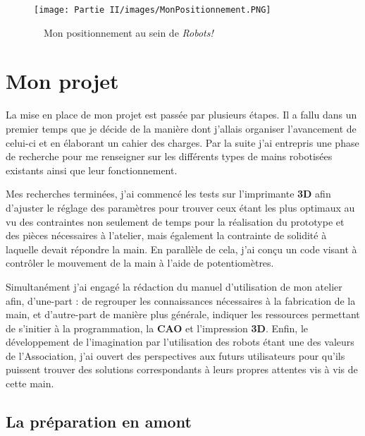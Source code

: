 \begin{figure}[!h]
    \centering
    \texttt{[image: Partie II/images/MonPositionnement.PNG]}
    \caption{\, \, Mon positionnement au sein de \textit{Robots!}}
    \label{fig_3.2.0.1}
\end{figure}


\section{Mon projet}

La mise en place de mon projet est passée par plusieurs étapes. Il a fallu dans un premier temps que je décide de la manière dont j'allais organiser l'avancement de celui-ci et en élaborant un cahier des charges. Par la suite j'ai entrepris une phase de recherche pour me renseigner sur les différents types de mains robotisées existants ainsi que leur fonctionnement. 

\vspace{0.5cm}
Mes recherches terminées, j'ai commencé les tests sur l'imprimante \textbf{3D} afin d'ajuster le réglage des paramètres pour trouver ceux étant les plus optimaux au vu des contraintes non seulement de temps pour la réalisation du prototype et des pièces nécessaires à l'atelier, mais également la contrainte de solidité à laquelle devait répondre la main. En parallèle de cela, j'ai conçu un code visant à contrôler le mouvement de la main à l'aide de potentiomètres.

\vspace{0.5cm}
Simultanément j'ai engagé la rédaction du manuel d'utilisation de mon atelier afin, d'une-part : de regrouper les connaissances nécessaires à la fabrication de la main, et d'autre-part de manière plus générale, indiquer les ressources permettant de s'initier à la programmation, la \textbf{CAO} et l'impression \textbf{3D}. Enfin, le développement de l'imagination par l'utilisation des robots étant une des valeurs de l'Association, j'ai ouvert des perspectives aux futurs utilisateurs pour qu'ils puissent trouver des solutions correspondants à leurs propres attentes vis à vis de cette main. 

\newpage

\subsection{La préparation en amont}
